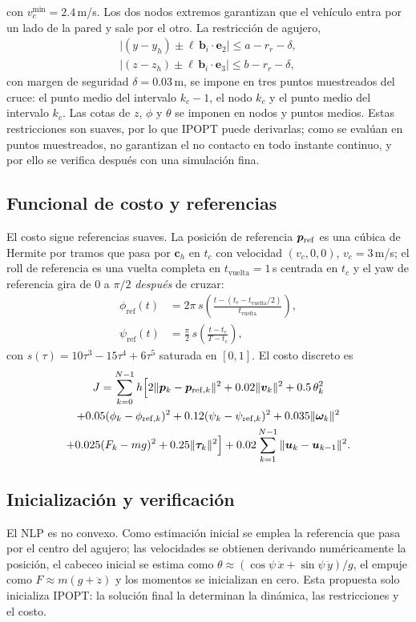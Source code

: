 con $v_c^{\min}=2.4$\,m/s. Los dos nodos extremos garantizan que el vehículo entra por un lado de la pared y sale por el otro. La restricción de agujero,
\begin{align*}
\Big|(y-y_h)\pm\ell\,\bm b_i\!\cdot\!\mathbf e_2\Big|\le a-r_r-\delta,\\
\Big|(z-z_h)\pm\ell\,\bm b_i\!\cdot\!\mathbf e_3\Big|\le b-r_r-\delta,
\end{align*}
con margen de seguridad $\delta=0.03$\,m, se impone en tres puntos muestreados del cruce: el punto medio del intervalo $k_c-1$, el nodo $k_c$ y el punto medio del intervalo $k_c$. Las cotas de $z$, $\phi$ y $\theta$ se imponen en nodos y puntos medios. Estas restricciones son suaves, por lo que IPOPT puede derivarlas; como se evalúan en puntos muestreados, no garantizan el no contacto en todo instante continuo, y por ello se verifica después con una simulación fina.

\subsection{Funcional de costo y referencias}
El costo sigue referencias suaves. La posición de referencia $\bm{p}_{\mathrm{ref}}$ es una cúbica de Hermite por tramos que pasa por $\bm c_h$ en $t_c$ con velocidad $(v_c,0,0)$, $v_c=3$\,m/s; el roll de referencia es una vuelta completa en $t_{\mathrm{vuelta}}=1$\,s centrada en $t_c$ y el yaw de referencia gira de $0$ a $\pi/2$ \emph{después} de cruzar:
\begin{align*}
\phi_{\mathrm{ref}}(t)&=2\pi\,s\!\left(\frac{t-(t_c-t_{\mathrm{vuelta}}/2)}{t_{\mathrm{vuelta}}}\right),\\
\psi_{\mathrm{ref}}(t)&=\frac{\pi}{2}\,s\!\left(\frac{t-t_c}{T-t_c}\right),
\end{align*}
con $s(\tau)=10\tau^3-15\tau^4+6\tau^5$ saturada en $[0,1]$. El costo discreto es
\begin{multline*}
J=\sum_{k=0}^{N-1}h\Big[2\|\bm{p}_k-\bm{p}_{\mathrm{ref},k}\|^2+0.02\|\bm{v}_k\|^2+0.5\,\theta_k^2\\
+0.05(\phi_k-\phi_{\mathrm{ref},k})^2+0.12(\psi_k-\psi_{\mathrm{ref},k})^2+0.035\|\bm{\omega}_k\|^2\\
+0.025(F_k-mg)^2+0.25\|\bm{\tau}_k\|^2\Big]+0.02\sum_{k=1}^{N-1}\|\bm{u}_k-\bm{u}_{k-1}\|^2 .
\end{multline*}

\subsection{Inicialización y verificación}
El NLP es no convexo. Como estimación inicial se emplea la referencia que pasa por el centro del agujero; las velocidades se obtienen derivando numéricamente la posición, el cabeceo inicial se estima como $\theta\approx(\cos\psi\,\ddot x+\sin\psi\,\ddot y)/g$, el empuje como $F\approx m(g+\ddot z)$ y los momentos se inicializan en cero. Esta propuesta solo inicializa IPOPT: la solución final la determinan la dinámica, las restricciones y el costo.


